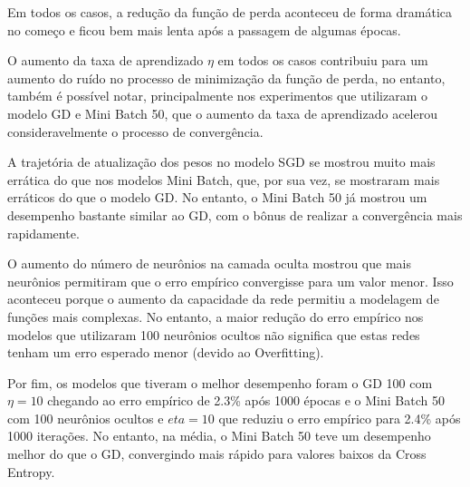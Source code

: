 \documentclass{report}
\begin{document}
Em todos os casos, a redução da função de perda aconteceu de forma dramática no começo e ficou
bem mais lenta após a passagem de algumas épocas.

O aumento da taxa de aprendizado $ \eta $ em todos os casos contribuiu para um aumento do ruído
no processo de minimização da função de perda, no entanto, também é possível notar, principalmente
nos experimentos que utilizaram o modelo GD e Mini Batch 50, que o aumento da taxa de aprendizado
acelerou consideravelmente o processo de convergência.

A trajetória de atualização dos pesos no modelo SGD se mostrou muito mais errática do que nos modelos
Mini Batch, que, por sua vez, se mostraram mais erráticos do que o modelo GD. No entanto, o
Mini Batch 50 já mostrou um desempenho bastante similar ao GD, com o bônus de realizar a convergência
mais rapidamente.

O aumento do número de neurônios na camada oculta mostrou que mais neurônios permitiram que o erro empírico
convergisse para um valor menor. Isso aconteceu porque o aumento da capacidade da rede permitiu a modelagem
de funções mais complexas. No entanto, a maior redução do erro empírico nos modelos que utilizaram 100 
neurônios ocultos não significa que estas redes tenham um erro esperado menor (devido ao Overfitting).

Por fim, os modelos que tiveram o melhor desempenho foram o GD 100 com $ \eta = 10 $ chegando ao erro
empírico de 2.3\% após 1000 épocas e o Mini Batch 50 com 100 neurônios ocultos e $ eta = 10 $ que reduziu
o erro empírico para 2.4\% após 1000 iterações. No entanto, na média, o Mini Batch 50 teve um desempenho
melhor do que o GD, convergindo mais rápido para valores baixos da Cross Entropy.
\end{document}
